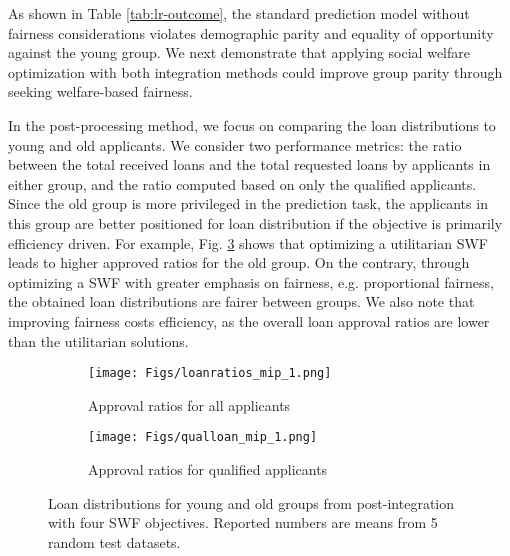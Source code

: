 \documentclass{article}[11pt]
\begin{document}
As shown in Table \ref{tab:lr-outcome}, the standard prediction model without fairness considerations violates demographic parity and equality of opportunity against the young group. We next demonstrate that applying social welfare optimization with both integration methods could improve group parity through seeking welfare-based fairness. 

In the post-processing method, we focus on comparing the loan distributions to young and old applicants. We consider two performance metrics: the ratio between the total received loans and the total requested loans by applicants in either group, and the ratio computed based on only the qualified applicants. Since the old group is more privileged in the prediction task, the applicants in this group are better positioned for loan distribution if the objective is primarily efficiency driven. For example, Fig. \ref{fig:util-dist} shows that optimizing a utilitarian SWF leads to higher approved ratios for the old group. On the contrary, through optimizing a SWF with greater emphasis on fairness, e.g. proportional fairness, the obtained loan distributions are fairer between groups. We also note that improving fairness costs efficiency, as the overall loan approval ratios are lower than the utilitarian solutions.
\begin{figure}[h]
    \centering
    \begin{subfigure}{0.8\textwidth}
    \centering
    \texttt{[image: Figs/loanratios\_mip\_1.png]}
    \vspace{-5ex}
    \caption{Approval ratios for all applicants}
    \label{fig:app-ratio}
    \end{subfigure}
        \begin{subfigure}{0.8\textwidth}
        \centering
    \texttt{[image: Figs/qualloan\_mip\_1.png]}
        \vspace{-5ex}
    \caption{Approval ratios for qualified applicants}
    \label{fig:app-qual-ratio}
    \end{subfigure}
    \caption{\small{Loan distributions for young and old groups from post-integration with four SWF objectives. Reported numbers are means from 5 random test datasets.}}
    \label{fig:util-dist}
\end{figure}

\end{document}
